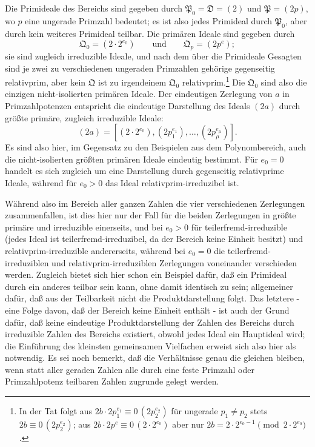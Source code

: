 \documentclass[11pt]{article}
\newcommand{\ideal}[1]{\mathfrak{#1}}
\newcommand{\eqzero}[1]{\equiv 0\,(#1)}
\begin{document}
Die Primideale des Bereichs sind gegeben durch $\ideal P_0=\ideal D=(2)$ und $\ideal P=(2p)$, wo $p$ eine ungerade Primzahl bedeutet; es ist also jedes Primideal durch $\ideal P_0$, aber durch kein weiteres Primideal teilbar. Die primären Ideale sind gegeben durch
\[
 \ideal Q_0=(2\cdot2^{e_0})
 \qquad\text{und}\qquad
 \ideal Q_p=(2p^e);
\]
sie sind zugleich irreduzible Ideale, und nach dem über die Primideale Gesagten sind je zwei zu verschiedenen ungeraden Primzahlen gehörige gegenseitig relativprim, aber kein $\ideal Q$ ist zu irgendeinem $\ideal Q_0$ relativprim.\footnote{In der Tat folgt aus $2b\cdot2p_1^{e_1}\eqzero{2p_2^{e_2}}$ für ungerade $p_1\ne p_2$ stets $2b\eqzero{2p_2^{e_2}}$; aus $2b\cdot2p^e\eqzero{2\cdot2^{e_0}}$ aber nur $2b=2\cdot2^{e_0-1}\pmod{2\cdot2^{e_0}}$.} Die $\ideal Q_0$ sind also die einzigen nicht-isolierten primären Ideale. Der eindeutigen Zerlegung von $a$ in Primzahlpotenzen entspricht die eindeutige Darstellung des Ideals $(2a)$ durch größte primäre, zugleich irreduzible Ideale:
\[
 (2a)=[(2\cdot2^{e_0}),(2p_1^{e_1}),
\ldots,(2p_\mu^{e_\mu})].
\]
Es sind also hier, im Gegensatz zu den Beispielen aus dem Polynombereich, auch die nicht-isolierten größten primären Ideale eindeutig bestimmt. Für $e_0=0$ handelt es sich zugleich um eine Darstellung durch gegenseitig relativprime Ideale, während für $e_0>0$ das Ideal relativprim-irreduzibel ist.

Während also im Bereich aller ganzen Zahlen die vier verschiedenen Zerlegungen zusammenfallen, ist dies hier nur der Fall für die beiden Zerlegungen in größte primäre und irreduzible einerseits, und bei $e_0>0$ für teilerfremd-irreduzible (jedes Ideal ist teilerfremd-irreduzibel, da der Bereich keine Einheit besitzt) und relativprim-irreduzible andererseits, während bei $e_0=0$ die teilerfremd-irreduziblen und relativprim-irreduziblen Zerlegungen voneinander verschieden werden. Zugleich bietet sich hier schon ein Beispiel dafür, daß ein Primideal durch ein anderes teilbar sein kann, ohne damit identisch zu sein; allgemeiner dafür, daß aus der Teilbarkeit nicht die Produktdarstellung folgt. Das letztere - eine Folge davon, daß der Bereich keine Einheit enthält - ist auch der Grund dafür, daß keine eindeutige Produktdarstellung der Zahlen des Bereichs durch irreduzible Zahlen des Bereichs existiert, obwohl jedes Ideal ein Hauptideal wird; die Einführung des kleinsten gemeinsamen Vielfachen erweist sich also hier als notwendig. Es sei noch bemerkt, daß die Verhältnisse genau die gleichen bleiben, wenn statt aller geraden Zahlen alle durch eine feste Primzahl oder Primzahlpotenz teilbaren Zahlen zugrunde gelegt werden.
\end{document}
